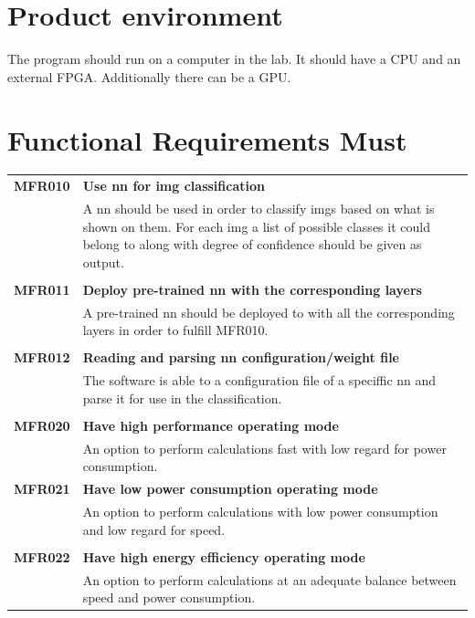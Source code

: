 \documentclass[parskip=full]{scrartcl}
\begin{document}
\section{Product environment}
The program should run on a computer in the lab. It should have a CPU and an external FPGA. Additionally there can be a GPU.

\section{Functional Requirements Must}
\begin{tabular}{p{2cm}p{12cm}}
\textbf{MFR010} & \textbf{Use \gls{nn} for \gls{img} classification}\\                                     
& A \gls{nn} should be used in order to classify \glspl{img} based on what is shown on them. For each \gls{img} a list of possible classes it could belong to along with degree of confidence should be given as output.\\
& \\
\textbf{MFR011} & \textbf{Deploy pre-trained \gls{nn} with the corresponding layers}\\
& A pre-trained \gls{nn} should be deployed to with all the corresponding layers in order to fulfill MFR010.\\
& \\
\textbf{MFR012} & \textbf{Reading and parsing \gls{nn} configuration/weight file}\\
& The software is able to a configuration file of a speciffic \gls{nn} and parse it for use in the classification.\\
& \\
\textbf{MFR020} & \textbf{Have high performance operating mode}\\                                     
& An option to perform calculations fast with low regard for power consumption.\\
\textbf{MFR021} & \textbf{Have low power consumption operating mode}\\                                     
& An option to perform calculations with low power consumption and low regard for speed.\\
& \\
\textbf{MFR022} & \textbf{Have high energy efficiency operating mode}\\                                     
& An option to perform calculations at an adequate balance between speed and power consumption.\\

\end{tabular}
\end{document}
